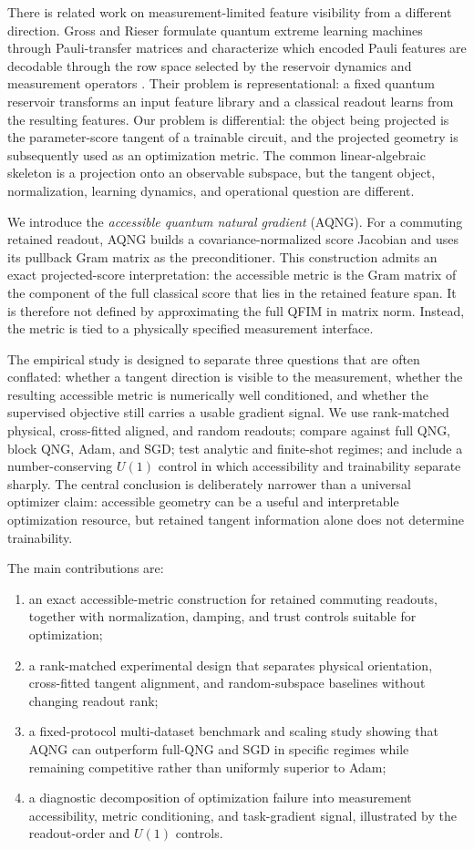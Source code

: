 There is related work on measurement-limited feature visibility from a different direction. Gross and Rieser formulate quantum extreme learning machines through Pauli-transfer matrices and characterize which encoded Pauli features are decodable through the row space selected by the reservoir dynamics and measurement operators \cite{GrossRieser2026}. Their problem is representational: a fixed quantum reservoir transforms an input feature library and a classical readout learns from the resulting features. Our problem is differential: the object being projected is the parameter-score tangent of a trainable circuit, and the projected geometry is subsequently used as an optimization metric. The common linear-algebraic skeleton is a projection onto an observable subspace, but the tangent object, normalization, learning dynamics, and operational question are different.

We introduce the \emph{accessible quantum natural gradient} (AQNG). For a commuting retained readout, AQNG builds a covariance-normalized score Jacobian and uses its pullback Gram matrix as the preconditioner. This construction admits an exact projected-score interpretation: the accessible metric is the Gram matrix of the component of the full classical score that lies in the retained feature span. It is therefore not defined by approximating the full QFIM in matrix norm. Instead, the metric is tied to a physically specified measurement interface.

The empirical study is designed to separate three questions that are often conflated: whether a tangent direction is visible to the measurement, whether the resulting accessible metric is numerically well conditioned, and whether the supervised objective still carries a usable gradient signal. We use rank-matched physical, cross-fitted aligned, and random readouts; compare against full QNG, block QNG, Adam, and SGD; test analytic and finite-shot regimes; and include a number-conserving $U(1)$ control in which accessibility and trainability separate sharply. The central conclusion is deliberately narrower than a universal optimizer claim: accessible geometry can be a useful and interpretable optimization resource, but retained tangent information alone does not determine trainability.

The main contributions are:
\begin{enumerate}
    \item an exact accessible-metric construction for retained commuting readouts, together with normalization, damping, and trust controls suitable for optimization;
    \item a rank-matched experimental design that separates physical orientation, cross-fitted tangent alignment, and random-subspace baselines without changing readout rank;
    \item a fixed-protocol multi-dataset benchmark and scaling study showing that AQNG can outperform full-QNG and SGD in specific regimes while remaining competitive rather than uniformly superior to Adam;
    \item a diagnostic decomposition of optimization failure into measurement accessibility, metric conditioning, and task-gradient signal, illustrated by the readout-order and $U(1)$ controls.
\end{enumerate}
